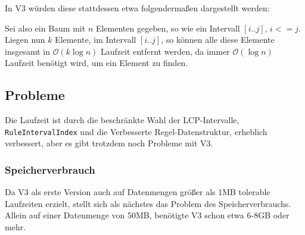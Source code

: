 \begin{figure}[H]
	\centering
	\quad
\end{figure}

In V3 würden diese stattdessen etwa folgendermaßen dargestellt werden:

\begin{figure}[H]
	\centering
\end{figure}

Sei also ein Baum mit $n$ Elementen gegeben, so wie ein Intervall $[i..j]$, $i <= j$. Liegen nun $k$ Elemente, im Intervall $[i..j]$, so können alle diese Elemente insgesamt in $\mathcal{O}(k \log n)$ Laufzeit entfernt werden, da immer $\mathcal{O}(\log n)$ Laufzeit benötigt wird, um ein Element zu finden.

\subsection{Probleme}
\label{v3problems}

Die Laufzeit ist durch die beschränkte Wahl der LCP-Intervalle, \texttt{RuleIntervalIndex} und die Verbesserte Regel-Datenstruktur, erheblich verbessert, aber es gibt trotzdem noch Probleme mit V3.

\subsubsection{Speicherverbrauch}
Da V3 als erste Version auch auf Datenmengen größer als 1MB tolerable Laufzeiten erzielt, stellt sich als nächstes das Problem des Speicherverbrauchs. Allein auf einer Datenmenge von 50MB, benötigte V3 schon etwa 6-8GB oder mehr.

